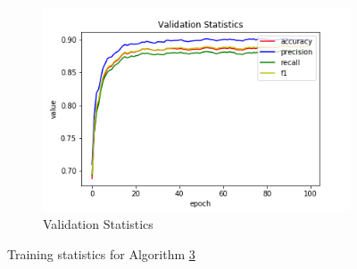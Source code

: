 \begin{figure}[h!]
\begin{subfigure}[b]{0.35\linewidth}
    \includegraphics[width=\linewidth]{images/trained_online_lstm/tile_by_tile_training_house_10000_model_validation_stats.png}
     \caption{Validation Statistics}
  \end{subfigure}
  \caption{Training statistics for Algorithm \hyperref[tab: app_evalalgorithms]{3}}
  \label{fig: train_olnine_lstm_3}
\end{figure}

